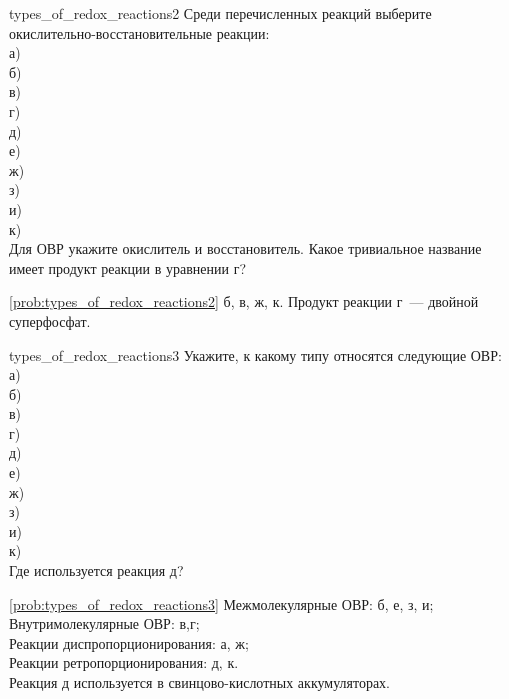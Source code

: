 \begin{problem}{}{types_of_redox_reactions2}
    Среди перечисленных реакций выберите окислительно-восстановительные реакции:\\
    а) \\
    б) \\
    в) \\
    г) \\
    д) \\
    е) \\
    ж) \\
    з) \\
    и) \\
    к) \\
    Для ОВР укажите окислитель и восстановитель. Какое тривиальное название имеет продукт реакции в уравнении г?
    \begin{sol}{\ref{prob:types_of_redox_reactions2}}
        б, в, ж, к. Продукт реакции г~--- двойной суперфосфат.
    \end{sol}
\end{problem}

\begin{problem}{}{types_of_redox_reactions3}
    Укажите, к какому типу относятся следующие ОВР:\\
    а) \\
    б) \\
    в) \\
    г) \\
    д) \\
    е) \\
    ж) \\
    з) \\
    и) \\
    к) \\
    Где используется реакция д?
    \begin{sol}{\ref{prob:types_of_redox_reactions3}}
        Межмолекулярные ОВР: б, е, з, и;\\
        Внутримолекулярные ОВР: в,г;\\
        Реакции диспропорционирования: а, ж;\\
        Реакции ретропорционирования: д, к.\\
        Реакция д используется в свинцово-кислотных аккумуляторах.
    \end{sol}
\end{problem}

